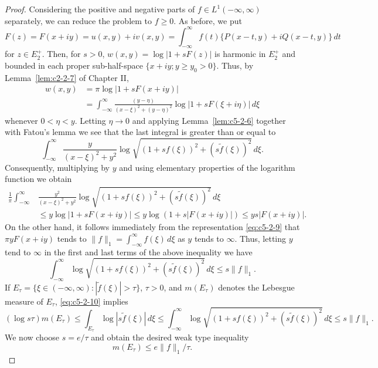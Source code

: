 \begin{proof}
Considering the positive and negative parts of $f \in L^{1}(-\infty, \infty)$
separately, we can reduce the problem to $f \geq 0$. As before, we put
\begin{equation}\label{eq:c5-2-9}
F(z)=F(x+iy)=u(x,y)+iv(x,y)
=\int_{-\infty}^{\infty}f(t)\{P(x-t,y)+iQ(x-t,y)\}\,dt
\end{equation}
for $z \in E_{2}^{+}$. Then, for $s > 0$,
$w(x, y) = \log|1 + sF(z)|$ is harmonic in $E_{2}^{+}$ and bounded in each
proper sub-half-space $\{x + iy ; y \geq y_{0} > 0\}$. Thus, by
Lemma~\ref{lem:c2-2-7} of Chapter II,
\begin{align*}
w(x,y)&=\pi\log|1+sF(x+iy)|\\
&=\int_{-\infty}^{\infty}\frac{(y-\eta)}{(x-\xi)^{2}+(y-\eta)^{2}}
\log|1+sF(\xi+i\eta)|\,d\xi
\end{align*}
whenever $0 < \eta < y$. Letting $\eta \to 0$ and applying
Lemma~\ref{lem:c5-2-6} together with Fatou's lemma we see that the last
integral is greater than or equal to
\[
\int_{-\infty}^{\infty}\frac{y}{(x-\xi)^{2}+y^{2}}
\log\sqrt{(1+sf(\xi))^{2}+(s\tilde{f}(\xi))^{2}}\,d\xi.
\]
Consequently, multiplying by $y$ and using elementary properties of the
logarithm function we obtain
\begin{align*}
\frac{1}{\pi}\int_{-\infty}^{\infty}&\frac{y^{2}}{(x-\xi)^{2}+y^{2}}
\log\sqrt{(1+sf(\xi))^{2}+(s\tilde{f}(\xi))^{2}}\,d\xi\\
&\leq y\log|1+sF(x+iy)|\leq y\log(1+s|F(x+iy)|)\leq ys|F(x+iy)|.
\end{align*}
On the other hand, it follows immediately from the representation
\eqref{eq:c5-2-9} that $\pi yF(x + iy)$ tends to
$\|f\|_{1} = \int_{-\infty}^{\infty}f(\xi)\,d\xi$ as $y$ tends to $\infty$.
Thus, letting $y$ tend to $\infty$ in the first and last terms of the above
inequality we have
\begin{equation}\label{eq:c5-2-10}
\int_{-\infty}^{\infty}\log\sqrt{(1+sf(\xi))^{2}+(s\tilde{f}(\xi))^{2}}\,d\xi
\leq s\|f\|_{1}.
\end{equation}
If $E_{\tau} = \{\xi \in (-\infty, \infty) : |\tilde{f}(\xi)| > \tau\}$,
$\tau > 0$, and $m(E_{\tau})$ denotes the Lebesgue measure of $E_{\tau}$,
\eqref{eq:c5-2-10} implies
\[
(\log s\tau)m(E_{\tau})\leq\int_{E_{\tau}}\log|s\tilde{f}(\xi)|\,d\xi
\leq\int_{-\infty}^{\infty}\log\sqrt{(1+sf(\xi))^{2}+(s\tilde{f}(\xi))^{2}}\,d\xi
\leq s\|f\|_{1}.
\]
We now choose $s = e/\tau$ and obtain the desired weak type inequality
\[
m(E_{\tau})\leq e\|f\|_{1}/\tau.
\]
\end{proof}

